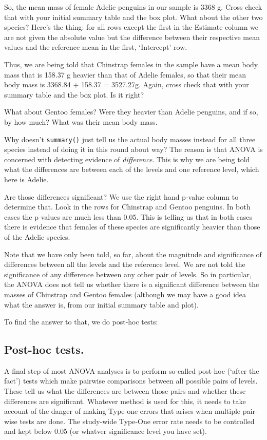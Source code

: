 \documentclass[
  letterpaper,
  DIV=11,
  numbers=noendperiod]{scrreprt}
\begin{document}
So, the mean mass of female Adelie penguins in our sample is 3368 g.
Cross check that with your initial summary table and the box plot. What
about the other two species? Here's the thing: for all rows except the
first in the Estimate column we are not given the absolute value but the
difference between their respective mean values and the reference mean
in the first, `Intercept' row.

Thus, we are being told that Chinstrap females in the sample have a mean
body mass that is 158.37 g heavier than that of Adelie females, so that
their mean body mass is 3368.84 + 158.37 = 3527.27g. Again, cross check
that with your summary table and the box plot. Is it right?

What about Gentoo females? Were they heavier than Adelie penguins, and
if so, by how much? What was their mean body mass.

Why doesn't \texttt{summary()} just tell us the actual body masses
instead for all three species instead of doing it in this round about
way? The reason is that ANOVA is concerned with detecting evidence of
\emph{difference}. This is why we are being told what the differences
are between each of the levels and one reference level, which here is
Adelie.

Are those differences significant? We use the right hand p-value column
to determine that. Look in the rows for Chinstrap and Gentoo penguins.
In both cases the p values are much less than 0.05. This is telling us
that in both cases there is evidence that females of these species are
significantly heavier than those of the Adelie species.

Note that we have only been told, so far, about the magnitude and
significance of differences between all the levels and the reference
level. We are not told the significance of any difference between any
other pair of levels. So in particular, the ANOVA does not tell us
whether there is a significant difference between the masses of
Chinstrap and Gentoo females (although we may have a good idea what the
answer is, from our initial summary table and plot).

To find the answer to that, we do post-hoc tests:

\subsection{Post-hoc tests.}\label{sec-post-hoc-tests}

A final step of most ANOVA analyses is to perform so-called post-hoc
(`after the fact') tests which make pairwise comparisons between all
possible pairs of levels. These tell us what the differences are between
those pairs and whether these differences are significant. Whatever
method is used for this, it needs to take account of the danger of
making Type-one errors that arises when multiple pair-wise tests are
done. The study-wide Type-One error rate needs to be controlled and kept
below 0.05 (or whatver significance level you have set).
\end{document}
